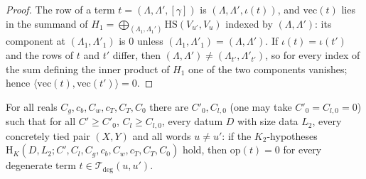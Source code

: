 \begin{proof}
The row of a term $t=(\Lambda,\Lambda',[\gamma])$ is $(\Lambda,\Lambda',\iota(t))$, and $\mathrm{vec}(t)$ lies in the summand of
$H_1=\bigoplus_{(\Lambda_1,\Lambda_1')}\mathrm{HS}(V_{u'},V_u)$ indexed by $(\Lambda,\Lambda')$: its component at
$(\Lambda_1,\Lambda'_1)$ is $0$ unless $(\Lambda_1,\Lambda'_1)=(\Lambda,\Lambda')$. If $\iota(t)=\iota(t')$ and the rows of $t$
and $t'$ differ, then $(\Lambda,\Lambda')\ne(\Lambda_{t'},\Lambda'_{t'})$, so for every index of the sum defining the inner
product of $H_1$ one of the two components vanishes; hence $\langle\mathrm{vec}(t),\mathrm{vec}(t')\rangle=0$.
\end{proof}

\begin{theorem}\label{pf:sh-siegel:kppoff}
For all reals $C_g,c_b,C_w,c_T,C_T,C_0$ there are $C'_0,C_{l,0}$ (one may take $C'_0=C_{l,0}=0$) such that for all
$C'\ge C'_0$, $C_l\ge C_{l,0}$, every datum $D$ with size data $L_2$, every concretely tied pair $(X,Y)$ and all words
$u\ne u'$: if the $K_2$-hypotheses $\mathrm{H}_K(D,L_2;C',C_l,C_g,c_b,C_w,c_T,C_T,C_0)$ hold, then
$\mathrm{op}(t)=0$ for every degenerate term $t\in\mathcal T_{\mathrm{deg}}(u,u')$.
\end{theorem}

